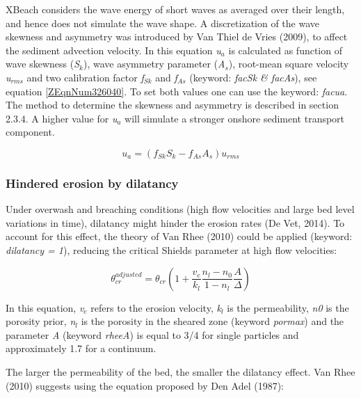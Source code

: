 \documentclass{article}
\begin{document}
\noindent XBeach considers the wave energy of short waves as averaged over their length, and hence does not simulate the wave shape. A discretization of the wave skewness and asymmetry was introduced by Van Thiel de Vries (2009), to affect the sediment advection velocity. In this equation \textit{u${}_{a}$} is calculated as function of wave skewness (\textit{S${}_{k}$}), wave asymmetry parameter (\textit{A${}_{s}$}), root-mean square velocity \textit{u${}_{rms}$} and two calibration factor \textit{f${}_{Sk}$} and\textit{ f${}_{As}$} (keyword: \textit{facSk \& facAs}), see equation \eqref{ZEqnNum326040}. To set both values one can use the keyword: \textit{facua}. The method to determine the skewness and asymmetry is described in section 2.3.4. A higher value for \textit{u${}_{a}$} will simulate a stronger onshore sediment transport component. 

\noindent 
\begin{equation} \label{ZEqnNum326040} 
u_{a} =(f_{Sk} S_{k} -f_{As} A_{s} )u_{rms}  
\end{equation} 


\subsubsection{ Hindered erosion by dilatancy}

\noindent Under overwash and breaching conditions (high flow velocities and large bed level variations in time), dilatancy might hinder the erosion rates (De Vet, 2014). To account for this effect, the theory of Van Rhee (2010) could be applied (keyword: \textit{dilatancy = 1}), reducing the critical Shields parameter at high flow velocities:

\noindent 
\begin{equation} \label{2.101)} 
\theta _{cr}^{adjusted} =\theta _{cr} \left(1+\frac{v_{e} }{k_{l} } \frac{n_{l} -n_{0} }{1-n_{l} } \frac{A}{\Delta } \right) 
\end{equation} 


\noindent In this equation, \textit{v${}_{e}$} refers to the erosion velocity, \textit{k${}_{l}$} is the permeability, \textit{n0} is the porosity prior, \textit{n${}_{l}$} is the porosity in the sheared zone (keyword \textit{pormax}) and the parameter \textit{A} (keyword \textit{rheeA}) is equal to 3/4 for single particles and approximately 1.7 for a continuum.

\noindent 

\noindent The larger the permeability of the bed, the smaller the dilatancy effect. Van Rhee (2010) suggests using the equation proposed by Den Adel (1987):
\end{document}
